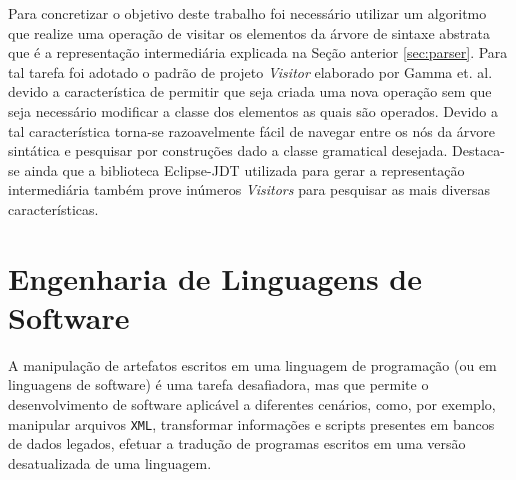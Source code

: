 Para concretizar o objetivo deste trabalho foi necessário utilizar um algoritmo que realize uma operação de visitar os elementos da árvore de sintaxe abstrata que é a representação intermediária explicada na Seção anterior \ref{sec:parser}. Para tal tarefa foi adotado o padrão de projeto \textit{Visitor} elaborado por Gamma et. al.\cite{Gamma:1995} devido a característica de permitir que seja criada uma nova operação sem que seja necessário modificar a classe dos elementos as quais são operados. Devido a tal característica torna-se razoavelmente fácil de navegar entre os nós da árvore sintática e pesquisar por construções dado a classe gramatical desejada. Destaca-se ainda que a biblioteca Eclipse-JDT utilizada para gerar a representação intermediária também prove inúmeros \textit{Visitors} para pesquisar as mais diversas características.

 



\section{Engenharia de Linguagens de Software}\label{sec:softEng}



A manipulaç\~{a}o de artefatos escritos em 
uma linguagem de programaç\~{a}o (ou em linguagens de software) 
\'{e} uma tarefa desafiadora, mas que permite o desenvolvimento 
de software aplic\'{a}vel a diferentes cen\'{a}rios, como, por exemplo, 
manipular arquivos \texttt{XML}, transformar 
informa\c c\~{o}es e scripts presentes 
em bancos de dados legados, efetuar a tradu\c c\~{a}o de programas 
escritos em uma vers\~{a}o desatualizada de uma linguagem. 


